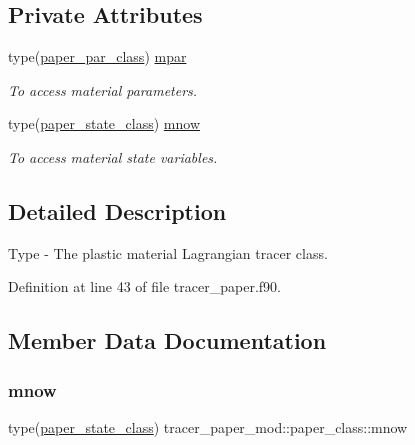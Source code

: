 \subsection*{Private Attributes}
\begin{DoxyCompactItemize}
\item 
type(\mbox{\hyperlink{structtracer__paper__mod_1_1paper__par__class}{paper\+\_\+par\+\_\+class}}) \mbox{\hyperlink{structtracer__paper__mod_1_1paper__class_a23ace4a6e578ffccaf1d5dcd91dc09b3}{mpar}}
\begin{DoxyCompactList}\small\item\em To access material parameters. \end{DoxyCompactList}\item 
type(\mbox{\hyperlink{structtracer__paper__mod_1_1paper__state__class}{paper\+\_\+state\+\_\+class}}) \mbox{\hyperlink{structtracer__paper__mod_1_1paper__class_a7156f27ec83059ac3b701502a4320858}{mnow}}
\begin{DoxyCompactList}\small\item\em To access material state variables. \end{DoxyCompactList}\end{DoxyCompactItemize}


\subsection{Detailed Description}
Type -\/ The plastic material Lagrangian tracer class. 

Definition at line 43 of file tracer\+\_\+paper.\+f90.



\subsection{Member Data Documentation}
\mbox{\label{structtracer__paper__mod_1_1paper__class_a7156f27ec83059ac3b701502a4320858}} 
\subsubsection{\texorpdfstring{mnow}{mnow}}
{\footnotesize\ttfamily type(\mbox{\hyperlink{structtracer__paper__mod_1_1paper__state__class}{paper\+\_\+state\+\_\+class}}) tracer\+\_\+paper\+\_\+mod\+::paper\+\_\+class\+::mnow\hspace{0.3cm}{\ttfamily [private]}}



